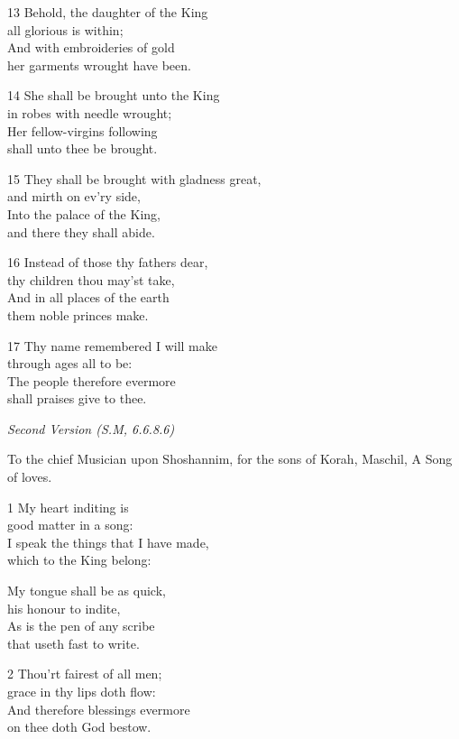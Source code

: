 13 Behold, the daughter of the King\\
all glorious is within;\\
And with embroideries of gold\\
her garments wrought have been.

14 She shall be brought unto the King\\
in robes with needle wrought;\\
Her fellow-virgins following\\
shall unto thee be brought.

15 They shall be brought with gladness great,\\
and mirth on ev’ry side,\\
Into the palace of the King,\\
and there they shall abide.

16 Instead of those thy fathers dear,\\
thy children thou may’st take,\\
And in all places of the earth\\
them noble princes make.

17 Thy name remembered I will make\\
through ages all to be:\\
The people therefore evermore\\
shall praises give to thee.

\begin{center}
\quad{}\quad{}
\end{center}

\emph{Second Version (S.M, 6.6.8.6)}

To the chief Musician upon Shoshannim,
for the sons of Korah, Maschil, A Song of loves.

1 My heart inditing is\\
good matter in a song:\\
I speak the things that I have made,\\
which to the King belong:

My tongue shall be as quick,\\
his honour to indite,\\
As is the pen of any scribe\\
that useth fast to write.

2 Thou’rt fairest of all men;\\
grace in thy lips doth flow:\\
And therefore blessings evermore\\
on thee doth God bestow.

